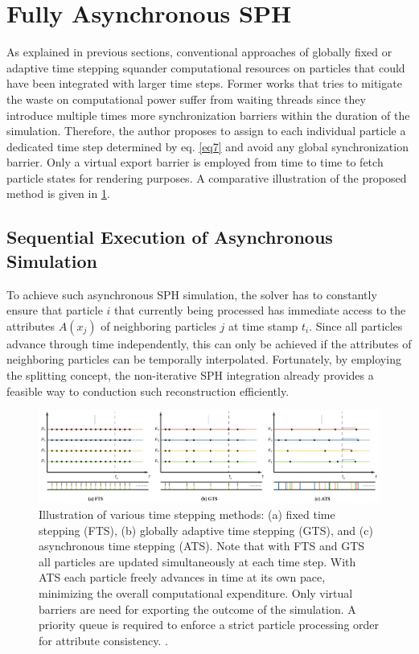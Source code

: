 \documentclass[
	11pt, 
	DIV10,
	ngerman,
	a4paper, 
	oneside, 
	headings=normal, 
	captions=tableheading,
	final, 
	numbers=noenddot
]{scrartcl}
\begin{document}
\section{Fully Asynchronous SPH}

As explained in previous sections, conventional approaches of globally fixed or adaptive time stepping squander computational resources on particles that could have been integrated with larger time steps. Former works that tries to mitigate the waste on computational power suffer from waiting threads since they introduce multiple times more synchronization barriers within the duration of the simulation. Therefore, the author proposes to assign to each individual particle a dedicated time step determined by eq. \ref{eq7} and avoid any global synchronization barrier. Only a virtual export barrier is employed from time to time to fetch particle states for rendering purposes. A comparative illustration of the proposed method is given in \ref{fig3}.

\subsection{Sequential Execution of Asynchronous Simulation}

To achieve such asynchronous SPH simulation, the solver has to constantly ensure that particle $ i $ that currently being processed has immediate access to the attributes $ A(x_{j}) $ of neighboring particles $ j $ at time stamp $ t_{i} $. Since all particles advance through time independently, this can only be achieved if the attributes of neighboring particles can be temporally interpolated. Fortunately, by employing the splitting concept, the non-iterative SPH integration already provides a feasible way to conduction such reconstruction efficiently.

\begin{figure}[tb]
	\centering
	\includegraphics[scale=0.17]{images/4}
	\caption{\label{fig3} Illustration of various time stepping methods: (a) fixed time stepping (FTS), (b) globally adaptive time stepping (GTS), and (c) asynchronous time stepping (ATS). Note that with FTS and GTS all particles are updated simultaneously at each time step. With ATS each particle freely advances in time at its own pace, minimizing the overall computational expenditure. Only virtual barriers are need for exporting the outcome of the simulation. A priority queue is required to enforce a strict particle processing order for attribute consistency. \cite{reinhardt2017fully}.}
\end{figure}
\end{document}
